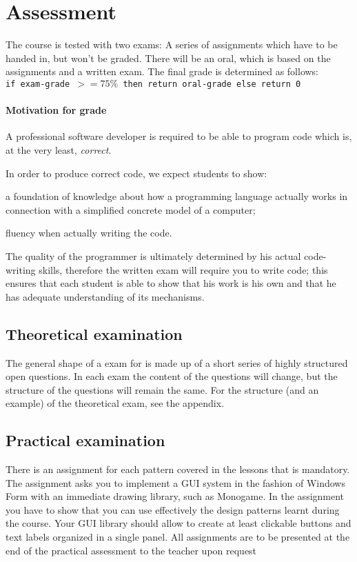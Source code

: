 \section{Assessment}
The course is tested with two exams:
A series of \glspl{assignment} which have to be handed in, but won't be graded. There will be an \gls{oral}, which is based on the \glspl{assignment}
and a written exam. The final grade is determined as follows: \\

\texttt{if \gls{exam}-grade $ >= 75\% $ then return \gls{oral}-grade else return 0}

\paragraph*{Motivation for grade}
A professional software developer is required to be able to program code which is, at the very least, \textit{correct}.

In order to produce correct code, we expect students to show:
\begin{inparaenum}
\item a foundation of knowledge about how a programming language actually works in connection with a simplified concrete model of a computer;
\item fluency when actually writing the code.
\end{inparaenum}

The quality of the programmer is ultimately determined by his actual code-writing skills, therefore the written exam will require you to write code; this ensures that each student is able to show that his work is his own and that he has adequate understanding of its mechanisms.


\subsection{Theoretical examination \modulecode}
The general shape of a \gls{exam} for \texttt{\modulecode} is made up of a short series of highly structured open questions.
In each exam the content of the questions will change, but the structure of the questions will remain the same.
For the structure (and an example) of the theoretical exam, see the appendix.


\subsection{Practical examination \modulecode}
There is an assignment for each pattern covered in the lessons that is mandatory. The assignment asks you to implement a GUI system in the fashion of Windows Form with an immediate drawing library, such as Monogame. In the assignment you have to show that you can use effectively the design patterns learnt during the course. Your GUI library should allow to create at least clickable buttons and text labels organized in a single panel. All assignments are to be presented at the end of the practical assessment to the teacher upon request

